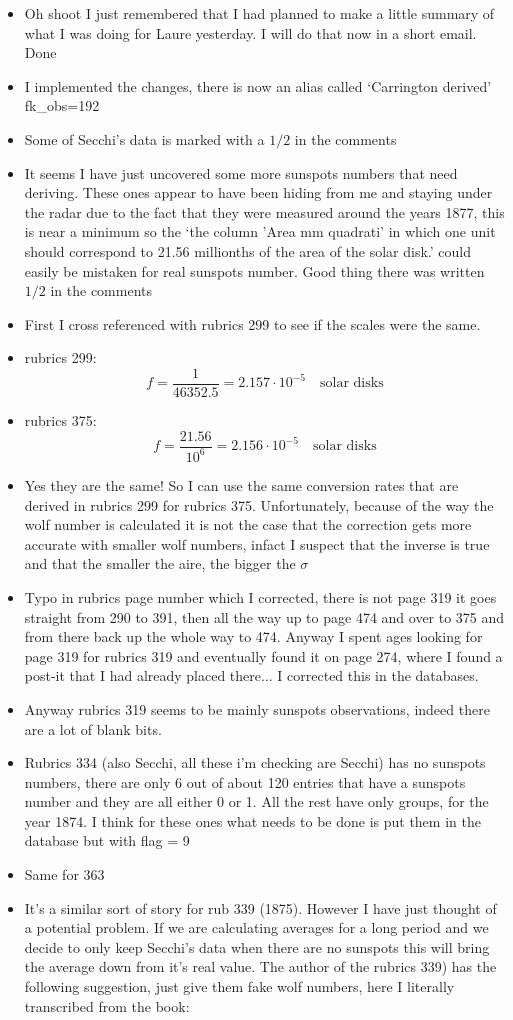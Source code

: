 \documentclass[12pt]{article}
\begin{document}
\begin{itemize}
    \item Oh shoot I just remembered that I had planned to make a little summary of what I was doing for Laure yesterday. I will do that now in a short email. Done
    \item I implemented the changes, there is now an alias called `Carrington derived' fk\_obs=192
    \item Some of Secchi's data is marked with a $1/2$ in the comments
    \item It seems I have just uncovered some more sunspots numbers that need deriving. These ones appear to have been hiding from me and staying under the radar due to the fact that they were measured around the years 1877, this is near a minimum so the `the column 'Area mm quadrati' in which one unit should correspond to 21.56 millionths of the area of the solar disk.' could easily be mistaken for real sunspots number. Good thing there was written $1/2$ in the comments
    \item First I cross referenced with rubrics 299 to see if the scales were the same.
    \item rubrics 299: $$f = \frac{1}{46352.5} = 2.157\cdot 10^{-5}\quad \text{solar disks}$$
    \item rubrics 375: $$f = \frac{21.56}{10^6} = 2.156 \cdot 10^{-5}\quad\text{solar disks}$$
    \item Yes they are the same! So I can use the same conversion rates that are derived in rubrics 299 for rubrics 375. Unfortunately, because of the way the wolf number is calculated it is not the case that the correction gets more accurate with smaller wolf numbers, infact I suspect that the inverse is true and that the smaller the aire, the bigger the $\sigma$
    \item Typo in rubrics page number which I corrected, there is not page 319 it goes straight from 290 to 391, then all the way up to page 474 and over to 375 and from there back up the whole way to 474. Anyway I spent ages looking for page 319 for rubrics 319 and eventually found it on page 274, where I found a post-it that I had already placed there... I corrected this in the databases.
    \item Anyway rubrics 319 seems to be mainly sunspots observations, indeed there are a lot of blank bits.
    \item Rubrics 334 (also Secchi, all these i'm checking are Secchi) has no sunspots numbers, there are only 6 out of about 120 entries that have a sunspots number and they are all either 0 or 1. All the rest have only groups, for the year 1874. I think for these ones what needs to be done is put them in the database but with flag = 9
    \item Same for 363
    \item It's a similar sort of story for rub 339 (1875). However I have just thought of a potential problem. If we are calculating averages for a long period and we decide to only keep Secchi's data when there are no sunspots this will bring the average down from it's real value. The author of the rubrics 339) has the following suggestion, just give them fake wolf numbers, here I literally transcribed from the book:


\end{itemize}
\end{document}
